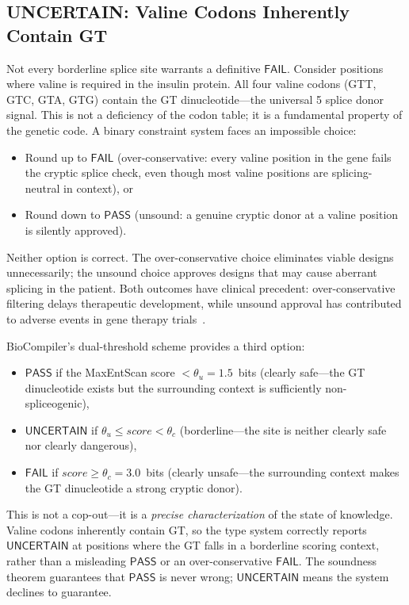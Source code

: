 \documentclass[acmsmall,review,anonymous]{acmart}
\newcommand{\PASS}{\ensuremath{\mathsf{PASS}}\xspace}
\newcommand{\FAIL}{\ensuremath{\mathsf{FAIL}}\xspace}
\newcommand{\UNCERTAIN}{\ensuremath{\mathsf{UNCERTAIN}}\xspace}
\begin{document}
\subsection{UNCERTAIN: Valine Codons Inherently Contain GT}

Not every borderline splice site warrants a definitive \FAIL.
Consider positions where valine is required in the insulin protein.
All four valine codons (GTT, GTC, GTA, GTG) contain the GT
dinucleotide---the universal 5\textquotesingle{} splice donor signal.
This is not a deficiency of the codon table; it is a fundamental
property of the genetic code.
A binary constraint system faces an impossible choice:
\begin{itemize}[leftmargin=*,itemsep=0pt,topsep=1pt]
\item Round up to \FAIL{} (over-conservative: every valine position
      in the gene fails the cryptic splice check, even though most
      valine positions are splicing-neutral in context), or
\item Round down to \PASS{} (unsound: a genuine cryptic donor at a
      valine position is silently approved).
\end{itemize}

Neither option is correct.
The over-conservative choice eliminates viable designs unnecessarily;
the unsound choice approves designs that may cause aberrant splicing
in the patient.
Both outcomes have clinical precedent: over-conservative filtering
delays therapeutic development, while unsound approval has contributed
to adverse events in gene therapy trials~\cite{hacein2018gene}.

BioCompiler's dual-threshold scheme provides a third option:
\begin{itemize}[leftmargin=*,itemsep=0pt,topsep=1pt]
\item \PASS{} if the MaxEntScan score $< \theta_u = 1.5$~bits
      (clearly safe---the GT dinucleotide exists but the surrounding
      context is sufficiently non-spliceogenic),
\item \UNCERTAIN{} if $\theta_u \le \mathit{score} < \theta_c$
      (borderline---the site is neither clearly safe nor clearly
      dangerous),
\item \FAIL{} if $\mathit{score} \ge \theta_c = 3.0$~bits
      (clearly unsafe---the surrounding context makes the GT
      dinucleotide a strong cryptic donor).
\end{itemize}

This is not a cop-out---it is a \emph{precise characterization} of
the state of knowledge.
Valine codons inherently contain GT, so the type system correctly
reports \UNCERTAIN{} at positions where the GT falls in a borderline
scoring context, rather than a misleading \PASS{} or an
over-conservative \FAIL.
The soundness theorem guarantees that \PASS{} is never wrong;
\UNCERTAIN{} means the system declines to guarantee.
\end{document}
